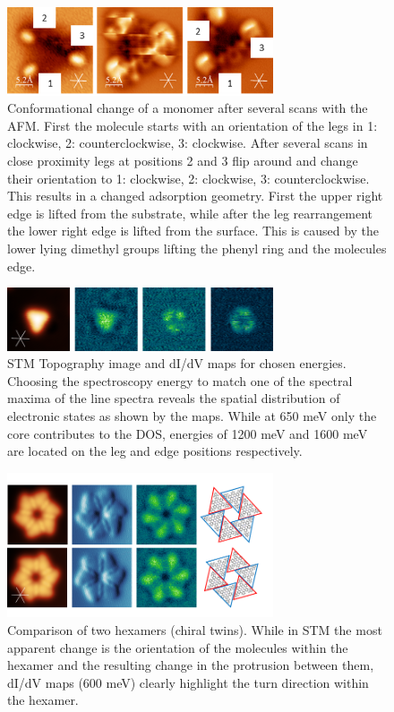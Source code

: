 \begin{figure}[] \centering
	\includegraphics[width=0.7\textwidth]{./images/hbbnc-ag-111-leg-flip}
	\caption{Conformational change of a monomer after several scans with the AFM. First the molecule starts with an orientation of the legs in 1: clockwise, 2: counterclockwise, 3: clockwise. After several scans in close proximity legs at positions 2 and 3 flip around and change their orientation to 1: clockwise, 2: clockwise, 3: counterclockwise. This results in a changed adsorption geometry. First the upper right edge is lifted from the substrate, while after the leg rearrangement the lower right edge is lifted from the surface. This is caused by the lower lying dimethyl groups lifting the phenyl ring and the molecules edge.}
	\label{fig:HBBNC-nc-AFM-legs-change}
\end{figure}

\begin{figure}[] \centering
	\includegraphics[width=0.7\textwidth]{./images/hbbnc-maps}
	\caption{STM Topography image and dI/dV maps for chosen energies. Choosing the spectroscopy energy to match one of the spectral maxima of the line spectra reveals the spatial distribution of electronic states as shown by the maps. While at 650 meV only the core contributes to the DOS, energies of 1200 meV and 1600 meV are located on the leg and edge positions respectively.}
	\label{fig:HBBNC-Ag111-dIdV-maps}
\end{figure}

\begin{figure}[] \centering
	\includegraphics[width=0.7\textwidth]{./images/hbbnc-maps2}
	\caption{Comparison of two hexamers (chiral twins). While in STM the most apparent change is the orientation of the molecules within the hexamer and the resulting change in the protrusion between them, dI/dV maps (600 meV) clearly highlight the turn direction within the hexamer.}
	\label{}
\end{figure}

